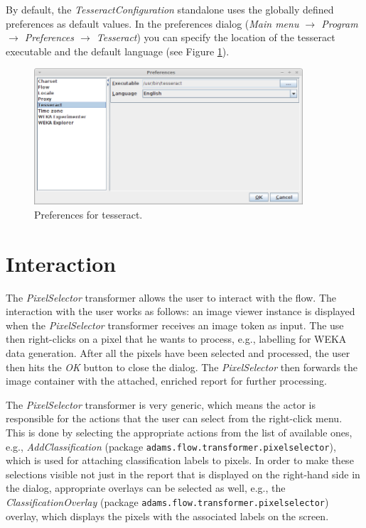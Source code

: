 \documentclass[a4paper]{book}
\begin{document}
By default, the \textit{TesseractConfiguration} standalone uses the globally
defined preferences as default values. In the preferences dialog 
(\textit{Main menu $\rightarrow$ Program $\rightarrow$ Preferences 
$\rightarrow$ Tesseract}) you can specify the location of the tesseract
executable and the default language (see Figure \ref{tesseract-preferences}).
\begin{figure}[htb]
  \centering
  \includegraphics[width=10.0cm]{images/tesseract-preferences.png}
  \caption{Preferences for tesseract.}
  \label{tesseract-preferences}
\end{figure}


\chapter{Interaction}
The \textit{PixelSelector} transformer allows the user to interact with the
flow. The interaction with the user works as follows: an image viewer instance
is displayed when the \textit{PixelSelector} transformer receives an image token
as input. The use then right-clicks on a pixel that he wants to process, e.g.,
labelling for WEKA data generation. After all the pixels have been selected and
processed, the user then hits the \textit{OK} button to close the dialog. The
\textit{PixelSelector} then forwards the image container with the
attached, enriched report for further processing.

The \textit{PixelSelector} transformer is very generic, which means the actor
is responsible for the actions that the user can select from the right-click
menu. This is done by selecting the appropriate actions from the list of
available ones, e.g., \textit{AddClassification} (package
\texttt{adams.flow.transformer.pixelselector}), which is used for attaching
classification labels to pixels. In order to make these selections visible not
just in the report that is displayed on the right-hand side in the dialog,
appropriate overlays can be selected as well, e.g., the
\textit{ClassificationOverlay} (package
\texttt{adams.flow.transformer.pixelselector}) overlay, which displays the
pixels with the associated labels on the screen.
\end{document}
